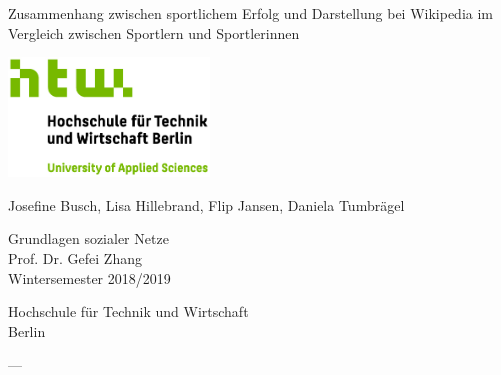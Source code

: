 \documentclass[11pt]{article}
\renewenvironment{abstract}
{{\bfseries\noindent{\abstractname}\par\nobreak}\footnotesize}
{\bigskip}
\begin{document}
\begin{titlepage}
   \begin{center}
       \vspace*{1cm}
       
       \Huge	
       Zusammenhang zwischen sportlichem Erfolg und Darstellung bei Wikipedia im Vergleich zwischen Sportlern und Sportlerinnen
 
       \vspace{2.0cm}
       
       \includegraphics[width=0.4\textwidth]{logo.jpg}
 
       \vspace{1.5cm}
       \LARGE
       Josefine Busch, Lisa Hillebrand, Flip Jansen, Daniela Tumbrägel
 
       \vfill
 
       Grundlagen sozialer Netze \\
       Prof. Dr. Gefei Zhang\\
       Wintersemester 2018/2019\\
 
       \vspace{0.8cm}
      
       Hochschule für Technik und Wirtschaft\\
       Berlin\\
 
   \end{center}
\end{titlepage}



\author{Lisa Hillebrand}%
\author{Josefine Busch}%
\author{Daniela Tumbrägel}%
\author{Flip Jansen}%
%





\pagebreak

\begin{abstract}
\textbf{}---%
\end{abstract}%
\end{document}
